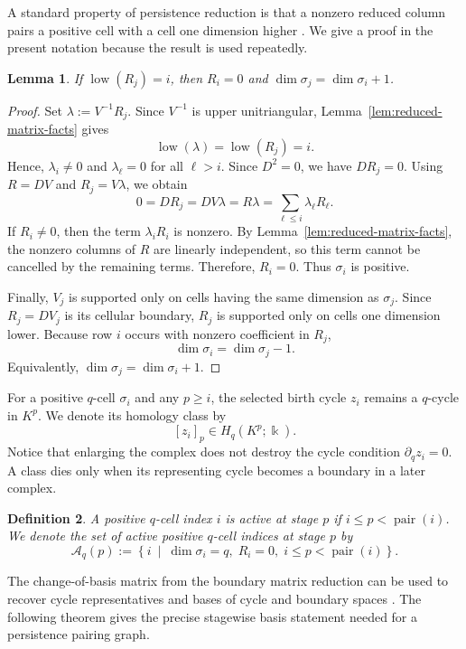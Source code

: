\documentclass[11pt]{article}
\theoremstyle{paperdefinition}
\newtheorem{definition}{Definition}[section]
\theoremstyle{paperplain}
\newtheorem{lemma}[definition]{Lemma}
\theoremstyle{paperremark}
\begin{document}
A standard property of persistence reduction is that a nonzero reduced column pairs a positive cell with a cell one dimension higher \cite{edelsbrunner2002topological,zomorodian2005computing}. We give a proof in the present notation because the result is used repeatedly.

\begin{lemma}
\label{lem:pivot-positive}
If $\operatorname{low}(R_j)=i$, then $R_i=0$ and $\dim\sigma_j=\dim\sigma_i+1$.
\end{lemma}

\begin{proof}
Set $\lambda:=V^{-1}R_j$. Since $V^{-1}$ is upper unitriangular, Lemma~\ref{lem:reduced-matrix-facts} gives
\[
\operatorname{low}(\lambda) = \operatorname{low}(R_j) = i.
\]
Hence, $\lambda_i\neq 0$ and $\lambda_\ell=0$ for all $\ell>i$. Since $D^2=0$, we have $DR_j=0$. Using $R=DV$ and $R_j=V\lambda$, we obtain
\[
0 =DR_j =DV\lambda =R\lambda =\sum_{\ell\leq i}\lambda_\ell R_\ell.
\]
If $R_i\neq 0$, then the term $\lambda_iR_i$ is nonzero. By Lemma~\ref{lem:reduced-matrix-facts}, the nonzero columns of $R$ are linearly independent, so this term cannot be cancelled by the remaining terms. Therefore, $R_i=0$. Thus $\sigma_i$ is positive.

Finally, $V_j$ is supported only on cells having the same dimension as $\sigma_j$. Since $R_j=DV_j$ is its cellular boundary, $R_j$ is supported only on cells one dimension lower. Because row $i$ occurs with nonzero coefficient in $R_j$,
\[
\dim\sigma_i = \dim\sigma_j-1.
\]
Equivalently, $\dim\sigma_j = \dim\sigma_i+1$.
\end{proof}

For a positive $q$-cell $\sigma_i$ and any $p\geq i$, the selected birth cycle $z_i$ remains a $q$-cycle in $K^p$. We denote its homology class by
\[
[z_i]_p \in H_q(K^p;\Bbbk).
\]
Notice that enlarging the complex does not destroy the cycle condition $\partial_q z_i=0$. A class dies only when its representing cycle becomes a boundary in a later complex.

\begin{definition}
\label{def:active-positive-index}
A positive $q$-cell index $i$ is \emph{active at stage $p$} if $i\leq p<\operatorname{pair}(i)$. We denote the set of active positive $q$-cell indices at stage $p$ by
\[
\mathcal A_q(p) := \left\{i\ \middle|\ \dim\sigma_i=q,\; R_i=0,\; i\leq p<\operatorname{pair}(i)\right\}.
\]
\end{definition}

The change-of-basis matrix from the boundary matrix reduction can be used to recover cycle representatives and bases of cycle and boundary spaces \cite{edelsbrunnerharer2010computational,hang2021umatch}. The following theorem gives the precise stagewise basis statement needed for a persistence pairing graph.
\end{document}
